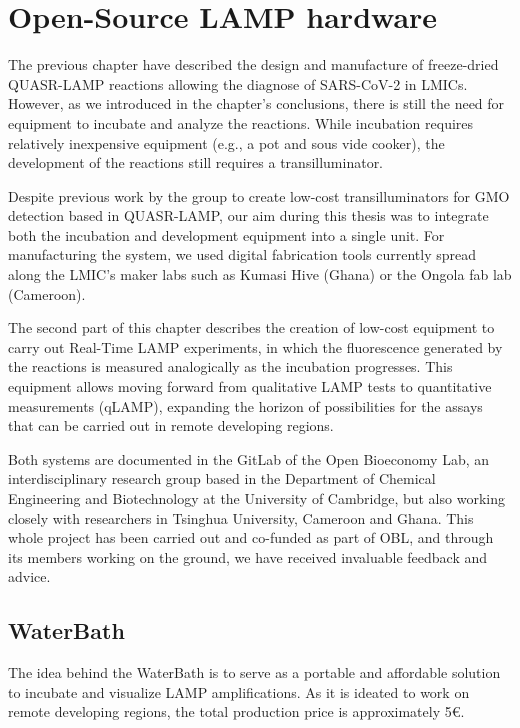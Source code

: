 
\chapter{Open-Source LAMP hardware}
The previous chapter have described the design and manufacture of freeze-dried QUASR-LAMP reactions allowing the diagnose of SARS-CoV-2 in LMICs. However, as we introduced in the chapter's conclusions, there is still the need for equipment to incubate and analyze the reactions. While incubation requires relatively inexpensive equipment (e.g., a pot and sous vide cooker), the development of the reactions still requires a transilluminator.

Despite previous work by the group to create low-cost transilluminators for GMO detection based in QUASR-LAMP\cite{guy_aidelberg_gmo_2018}, our aim during this thesis was to integrate both the incubation and development equipment into a single unit. For manufacturing the system, we used digital fabrication tools currently spread along the LMIC's maker labs such as Kumasi Hive (Ghana) or the Ongola fab lab (Cameroon).

The second part of this chapter describes the creation of low-cost equipment to carry out Real-Time LAMP experiments, in which the fluorescence generated by the reactions is measured analogically as the incubation progresses. This equipment allows moving forward from qualitative LAMP tests to quantitative measurements (qLAMP), expanding the horizon of possibilities for the assays that can be carried out in remote developing regions.

Both systems are documented in the GitLab of the Open Bioeconomy Lab\cite{francisco_javier_quero_lombardero_open_2021}, an interdisciplinary research group based in the Department of Chemical Engineering and Biotechnology at the University of Cambridge, but also working closely with researchers in Tsinghua University, Cameroon and Ghana. This whole project has been carried out and co-funded as part of OBL, and through its members working on the ground, we have received invaluable feedback and advice.
\newpage

\section{WaterBath}

The idea behind the WaterBath is to serve as a portable and affordable solution to incubate and visualize LAMP amplifications. As it is ideated to work on remote developing regions, the total production price is approximately 5€.

